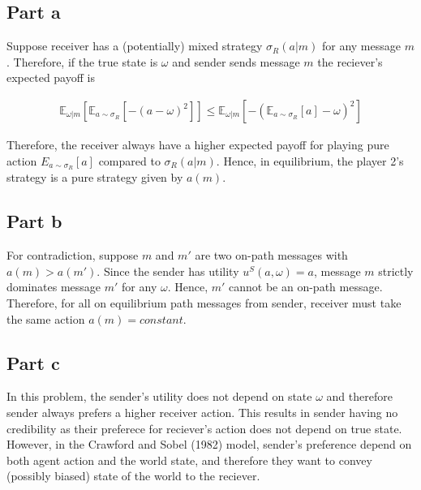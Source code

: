 \subsection*{Part a}

Suppose receiver has a (potentially) mixed strategy $\sigma_R(a| m)$ for any message $m$.  Therefore, if the true state is $\omega$ and sender sends message $m$ the reciever's expected payoff is 

\begin{align*}
    \mathbb E_{\omega|m}\left[\mathbb E_{a \sim \sigma_R} [-(a-\omega)^2] \right] \le \mathbb E_{\omega|m}\left[ -(\mathbb E_{a \sim \sigma_R}[a]-\omega)^2 \right]
\end{align*}

Therefore, the receiver always have a higher expected payoff for playing pure action $E_{a \sim \sigma_R}[a]$ compared to $\sigma_R(a|m)$. Hence, in equilibrium, the player 2's strategy is a pure strategy given by $a(m)$.

\subsection*{Part b}
For contradiction, suppose $m$ and $m'$ are two on-path messages with $a(m) > a(m')$. Since the sender has utility $u^S(a, \omega) = a$, message $m$ strictly dominates message $m'$ for any $\omega$. Hence, $m'$ cannot be an on-path message. Therefore, for all on equilibrium path messages from sender, receiver must take the same action $a(m) = constant$.

\subsection*{Part c}

In this problem, the sender's utility does not depend on state $\omega$ and therefore sender always prefers a higher receiver action. This results in sender having no credibility as their preferece for reciever's action does not depend on true state.\\

However, in the Crawford and Sobel (1982) model, sender's preference depend on both agent action and the world state, and therefore they want to convey (possibly biased) state of the world to the reciever. 